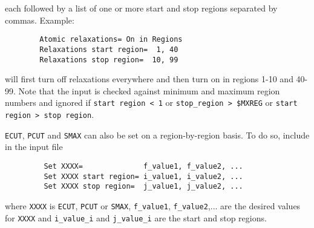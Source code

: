 each followed by a list of one or more
start and stop regions separated by commas.
Example:

\begin{verbatim}
        Atomic relaxations= On in Regions
        Relaxations start region=  1, 40
        Relaxations stop region=  10, 99
\end{verbatim}

will first turn off relaxations everywhere and
then turn on in regions 1-10 and 40-99.
Note that the input is checked against minimum
and maximum region numbers and ignored if
\verb+start region < 1+ or \verb+stop_region > $MXREG+ or
\verb+start region > stop region+.

\verb+ECUT+, \verb+PCUT+ and \verb+SMAX+ can also be set on a
region-by-region basis. To do so, include in the input file
\begin{verbatim}
         Set XXXX=              f_value1, f_value2, ...
         Set XXXX start region= i_value1, i_value2, ...
         Set XXXX stop region=  j_value1, j_value2, ...
\end{verbatim}
where \verb+XXXX+ is \verb+ECUT+, \verb+PCUT+ or \verb+SMAX+,
\verb+f_value1+, \verb+f_value2+,...
are the desired values for \verb+XXXX+ and \verb+i_value_i+ and
\verb+j_value_i+ are the start and stop regions.
